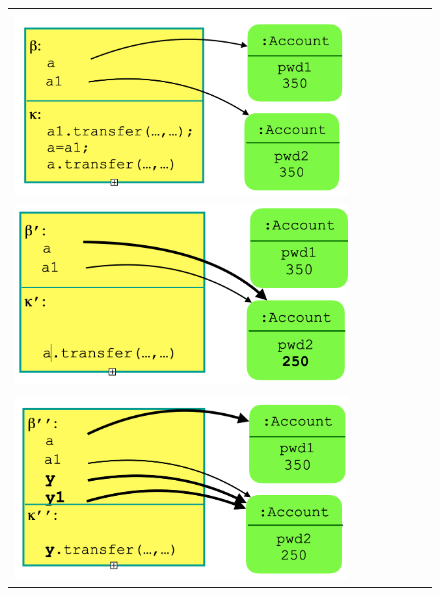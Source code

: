 \newcommand{\mathsmall}[1]{\substack{\scalebox{0.8}{$#1$}}}
\begin{figure}[tbp]
\begin{tabular}{clclc}
 \begin{minipage}{0.27\textwidth}
 $\sigma:$\\
 \includegraphics[width=\linewidth]{diagrams/adapt1.png}
   \end{minipage}
 & \ \ \ &
 \begin{minipage}{0.27\textwidth}
  $\sigma':$\\
  \includegraphics[width=\linewidth]{diagrams/adapt2.png}
   \end{minipage}
   & \ \ \  &
    \begin{minipage}{0.27\textwidth}
$\adapt {\sigma'}{\sigma}:$\\
  \includegraphics[width=\linewidth]{diagrams/adapt3.png}
   \end{minipage}
\end{tabular}


\end{figure}
